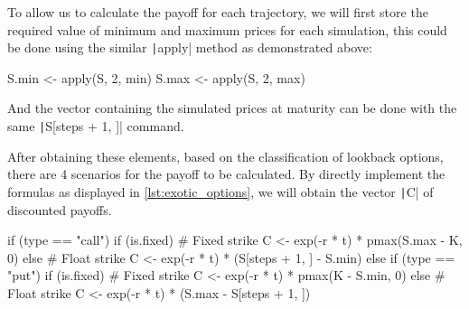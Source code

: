 To allow us to calculate the payoff for each trajectory, we will first store the required value of minimum and maximum prices for each simulation, this could be done using the similar \texttt|apply| method as demonstrated above:

\begin{Rminted}
S.min <- apply(S, 2, min)
S.max <- apply(S, 2, max)
\end{Rminted}

And the vector containing the simulated prices at maturity can be done with the same \texttt|S[steps + 1, ]| command.

After obtaining these elements, based on the classification of lookback options, there are 4 scenarios for the payoff to be calculated. By directly implement the formulas as displayed in \ref{lst:exotic_options}, we will obtain the vector \texttt|C| of discounted payoffs.

\begin{Rminted}
if (type == "call") {
    if (is.fixed) { # Fixed strike
        C <- exp(-r * t) * pmax(S.max - K, 0)
    } else { # Float strike
        C <- exp(-r * t) * (S[steps + 1, ] - S.min)
    }
} else if (type == "put") {
    if (is.fixed) { # Fixed strike
        C <- exp(-r * t) * pmax(K - S.min, 0)
    } else { # Float strike
        C <- exp(-r * t) * (S.max - S[steps + 1, ])
    }
}
\end{Rminted}

\newpage